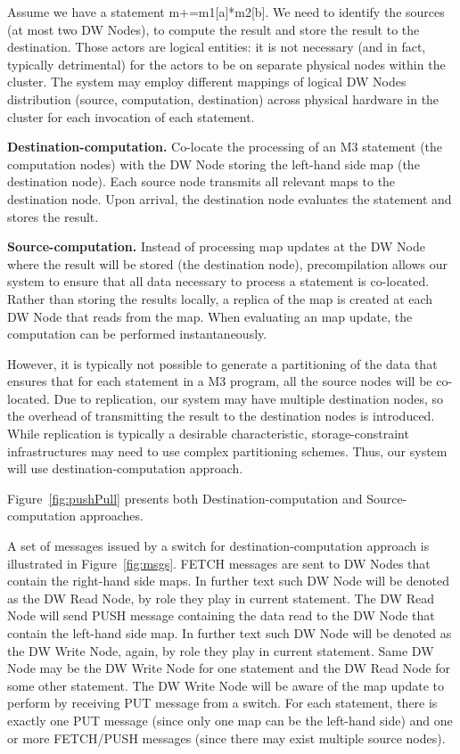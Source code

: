 \documentclass{sig-semester}
\def\M3{M3\xspace}
\begin{document}
Assume we have a statement m+=m1[a]*m2[b]. We need to identify the sources (at most two DW Nodes), to compute the result and store the result to the destination. Those actors are logical entities: it is not necessary (and in fact, typically detrimental) for the actors to be on separate physical nodes within the cluster. The system may employ different mappings of logical DW Nodes distribution (source, computation, destination) across physical hardware in the cluster for each invocation of each statement.

\textbf{Destination-computation.}
Co-locate the processing of an \M3 statement (the computation nodes) with the DW Node storing the left-hand side map (the destination node). Each source node transmits all relevant maps to the destination node. Upon arrival, the destination node evaluates the statement and stores the result.

\textbf{Source-computation.} Instead of processing map updates at the DW Node where the result will be stored (the destination node), precompilation allows our system to ensure that all data necessary to process a statement is co-located. Rather than storing the results locally, a replica of the map is created at each DW Node that reads from the map. When evaluating an map update, the computation can be performed instantaneously.

However, it is typically not possible to generate a partitioning of the data that ensures that for each statement in a \M3 program, all the source nodes will be co-located. Due to replication, our system may have multiple destination nodes, so the overhead of transmitting the result to the destination nodes is introduced. While replication is typically a desirable characteristic, storage-constraint infrastructures may need to use complex partitioning schemes. Thus, our system will use destination-computation approach.

Figure~\ref{fig:pushPull} presents both Destination-computation and Source-computation approaches.

A set of messages issued by a switch for destination-computation approach is illustrated in Figure~\ref{fig:msgs}. FETCH messages are sent to DW Nodes that contain the right-hand side maps. In further text such DW Node will be denoted as the DW Read Node, by role they play in current statement. The DW Read Node will send PUSH message containing the data read to the DW Node that contain the left-hand side map. In further text such DW Node will be denoted as the DW Write Node, again, by role they play in current statement. Same DW Node may be the DW Write Node for one statement and the DW Read Node for some other statement. The DW Write Node will be aware of the map update to perform by receiving PUT message from a switch. For each statement, there is exactly one PUT message (since only one map can be the left-hand side) and one or more FETCH/PUSH messages (since there may exist multiple source nodes).
\end{document}

